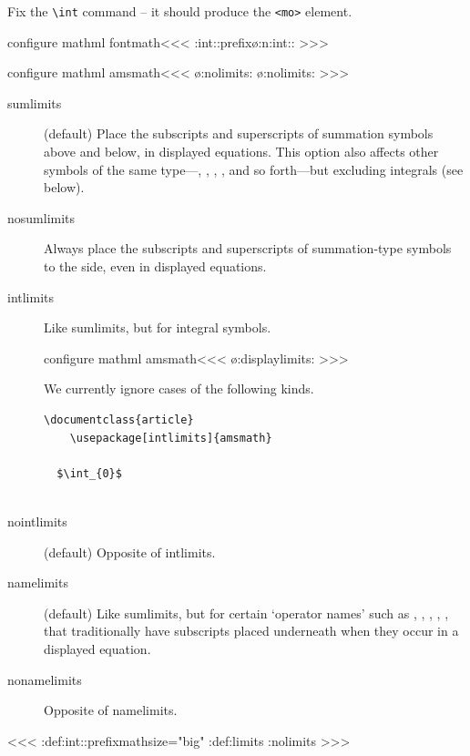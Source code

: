 {{{{{{Fix the \verb|\int| command -- it should produce the \verb|<mo>| element.

\<configure mathml fontmath\><<<
\def\:tempc{\ifDisplayMath\mathop:prefix{}\fi\o:n:int::}
\HLet\n:int:\:tempc
>>>


\<configure mathml amsmath\><<<
\ifx \ilimits@\o:nolimits:
  \let\ilimits@\nolimits
\fi
\ifx \ilimits@\o:nolimits:
  \let\slimits@\nolimits
\fi
>>>



\begin{description}
\item[sumlimits]
    (default) Place the subscripts and superscripts    of summation symbols above and below, in displayed equations. This option also affects other symbols of the same type---, , , , and so forth---but excluding integrals (see below).

\item[nosumlimits]
    Always place the subscripts and superscripts of summation-type symbols to the side, even in displayed equations.

\item[intlimits]
    Like sumlimits, but for integral  symbols.


\<configure mathml amsmath\><<<
\ifx \ilimits@\o:displaylimits: 
   \let\ilimits@\nolimits  
\fi 
>>>

We currently ignore cases of the following kinds.

\begin{verbatim}
\documentclass{article}  
    \usepackage[intlimits]{amsmath}  
  
  $\int_{0}$  
  
\end{verbatim}


\item[nointlimits]
    (default) Opposite of intlimits.

\item[namelimits]
    (default) Like sumlimits, but for certain `operator names' such as , , , , , that traditionally have subscripts   placed underneath when they occur in a displayed equation.

\item[nonamelimits]
    Opposite of namelimits. 
\end{description}




\<\><<<
\pend:def\n:int:{\ifDisplayMath\mathop:prefix{mathsize="big"}\fi}
\def\sum{\mathchar"1350}
\MathSymbol{}
\def\sum:limits{\expandafter\:same \math:sym\mathop{sum}\limits}
\def\sum:nolimits{\expandafter\:same \math:sym\mathop{sum}\nolimits}
\def\n:sum:{\ifDisplayMath \expandafter\sum:limits\else 
                           \expandafter\sum:nolimits\fi}
\pend:def\n:sum:{\ifDisplayMath\mathop:prefix{mathsize="big"}\fi}
>>>

}}}}}}
